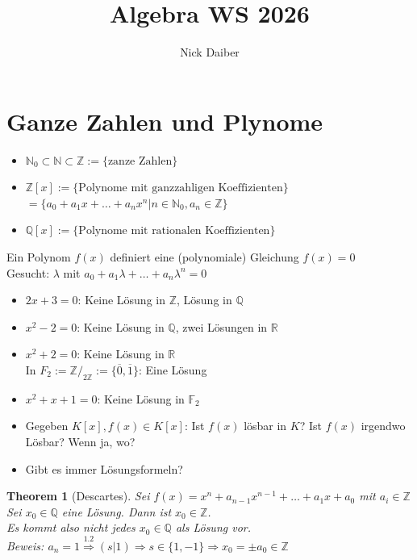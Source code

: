 \documentclass{article}
\title{Algebra WS 2026}
\author{Nick Daiber}
\newtheorem{thm}{Theorem}[section]
\newcommand{\N}{\mathbb{N}}
\newcommand{\Z}{\mathbb{Z}}
\newcommand{\R}{\mathbb{R}}
\newcommand{\Q}{\mathbb{Q}}
\newcommand{\F}{\mathbb{F}}
\begin{document}
\maketitle
\section{Ganze Zahlen und Plynome}
\begin{itemize}
    \item
           $\N_0\subset\N\subset\Z:=\{\text{zanze Zahlen}\}$
    \item
        $\Z[x]:=\{\text{Polynome mit ganzzahligen Koeffizienten}\}$\\
        $=\{a_0+a_1x+\hdots+a_nx^n|n\in\N_0,a_n\in\Z\}$
    \item
        $\Q[x]:=\{\text{Polynome mit rationalen Koeffizienten}\}$
\end{itemize}
Ein Polynom $f(x)$ definiert eine (polynomiale) Gleichung
$f(x)=0$\\
Gesucht: $\lambda$ mit $a_0+a_1\lambda+\hdots+a_n\lambda^n=0$\\
\begin{itemize}
    \item
        \color{purple}
        $2x+3=0$: Keine Lösung in $\Z$, Lösung in $\Q$
        \color{black}
    \item
        \color{purple}
        $x^2-2=0$: Keine Lösung in $\Q$, zwei Lösungen in $\R$
        \color{black}
    \item
        \color{purple}
        $x^2+2=0$: Keine Lösung in $\R$\\
        In $F_2:=\Z/_{2\Z}:=\{\overline{0},\overline{1}\}$:
        Eine Lösung
        \color{black}
    \item
        \color{purple}
        $x^2+x+1=0$: Keine Lösung in $\F_2$\\
        \color{black}
\end{itemize}
\begin{itemize}
    \item
        Gegeben $K[x],f(x)\in K[x]$: Ist $f(x)$ lösbar in $K$?
        Ist $f(x)$ irgendwo Lösbar? Wenn ja, wo?
    \item
        Gibt es immer Lösungsformeln?
\end{itemize}
\begin{thm}[Descartes]
    Sei $f(x)=x^n+a_{n-1}x^{n-1}+\hdots+a_1x+a_0$
    mit $a_i\in\Z$\\
    Sei $x_0\in\Q$ eine Lösung. Dann ist $x_0\in\Z$.\\
    \color{blue}
        Es kommt also nicht jedes $x_0\in\Q$ als Lösung vor.\\
    \color{black}
    Beweis: $a_n=1\overset{1.2}\Rightarrow (s|1)\Rightarrow
    s\in\{1,-1\}\Rightarrow x_0=\pm a_0\in\Z$
\end{thm}
\end{document}
